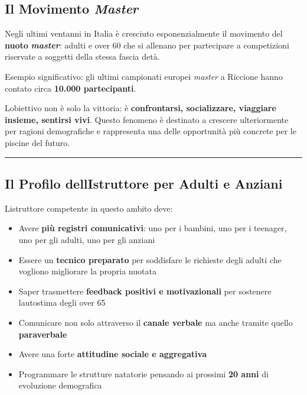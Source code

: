 \documentclass[a4paper,11pt]{article}
\providecommand{\tightlist}{%
  \setlength{\itemsep}{0pt}\setlength{\parskip}{0pt}}
\begin{document}
\subsection{\texorpdfstring{Il Movimento
            \emph{Master}}{Il Movimento Master}}\label{il-movimento-master}

Negli ultimi vent\textquotesingle anni in Italia è cresciuto
esponenzialmente il movimento del \textbf{nuoto} \textbf{\emph{master}}:
adulti e over 60 che si allenano per partecipare a competizioni
riservate a soggetti della stessa fascia d\textquotesingle età.

Esempio significativo: gli ultimi campionati europei \emph{master} a
Riccione hanno contato circa \textbf{10.000 partecipanti}.

L\textquotesingle obiettivo non è solo la vittoria: è
\textbf{confrontarsi, socializzare, viaggiare insieme, sentirsi vivi}.
Questo fenomeno è destinato a crescere ulteriormente per ragioni
demografiche e rappresenta una delle opportunità più concrete per le
piscine del futuro.

\begin{center}\rule{0.5\linewidth}{0.5pt}\end{center}

\subsection{Il Profilo dell\textquotesingle Istruttore per Adulti e
      Anziani}\label{il-profilo-dellistruttore-per-adulti-e-anziani}

L\textquotesingle istruttore competente in questo ambito deve:

\begin{itemize}
      \tightlist
      \item
            Avere \textbf{più registri comunicativi}: uno per i bambini, uno per i
            teenager, uno per gli adulti, uno per gli anziani
      \item
            Essere un \textbf{tecnico preparato} per soddisfare le richieste degli
            adulti che vogliono migliorare la propria nuotata
      \item
            Saper trasmettere \textbf{feedback positivi e motivazionali} per
            sostenere l\textquotesingle autostima degli over 65
      \item
            Comunicare non solo attraverso il \textbf{canale verbale} ma anche
            tramite quello \textbf{paraverbale}
      \item
            Avere una forte \textbf{attitudine sociale e aggregativa}
      \item
            Programmare le strutture natatorie pensando ai prossimi \textbf{20
                  anni} di evoluzione demografica
\end{itemize}
\end{document}
